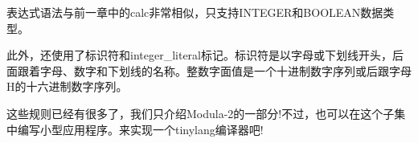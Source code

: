 表达式语法与前一章中的calc非常相似，只支持INTEGER和BOOLEAN数据类型。

此外，还使用了标识符和integer\_literal标记。标识符是以字母或下划线开头，后面跟着字母、数字和下划线的名称。整数字面值是一个十进制数字序列或后跟字母H的十六进制数字序列。

这些规则已经有很多了，我们只介绍Modula-2的一部分!不过，也可以在这个子集中编写小型应用程序。来实现一个tinylang编译器吧!

























